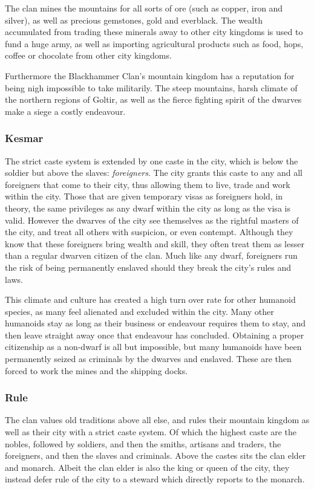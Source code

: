 The clan mines the mountains for all sorts of ore (such as copper, iron and
silver), as well as precious gemstones, gold and everblack. The wealth
accumulated from trading these minerals away to other city kingdoms is used to
fund a huge army, as well as importing agricultural products such as food,
hops, coffee or chocolate from other city kingdoms.

Furthermore the Blackhammer Clan's mountain kingdom has a reputation for being
nigh impossible to take militarily. The steep mountains, harsh climate of the
northern regions of Goltir, as well as the fierce fighting spirit of the dwarves
make a siege a costly endeavour.

\subsubsection{Kesmar}

The strict caste system is extended by one caste in the city, which is below
the soldier but above the slaves: \emph{foreigners}. The city grants this
caste to any and all foreigners that come to their city, thus allowing them to
live, trade and work within the city. Those that are given temporary visas as
foreigners hold, in theory, the same privileges as any dwarf within the city
as long as the visa is valid. However the dwarves of the city see themselves
as the rightful masters of the city, and treat all others with suspicion, or
even contempt. Although they know that these foreigners bring wealth and skill,
they often treat them as lesser than a regular dwarven citizen of the clan.
Much like any dwarf, foreigners run the risk of being permanently enslaved
should they break the city's rules and laws.

This climate and culture has created a high turn over rate for other humanoid
species, as many feel alienated and excluded within the city. Many other
humanoids stay as long as their business or endeavour requires them to stay,
and then leave straight away once that endeavour has concluded. Obtaining a
proper citizenship as a non-dwarf is all but impossible, but many humanoids
have been permanently seized as criminals by the dwarves and enslaved. These
are then forced to work the mines and the shipping docks.

\subsubsection{Rule}

The clan values old traditions above all else, and rules their mountain
kingdom as well as their city with a strict caste system. Of which the highest
caste are the nobles, followed by soldiers, and then the smiths, artisans and
traders, the foreigners, and then the slaves and criminals. Above the castes
sits the clan elder and monarch. Albeit the clan elder is also the king or queen
of the city, they instead defer rule of the city to a steward which directly
reports to the monarch.

